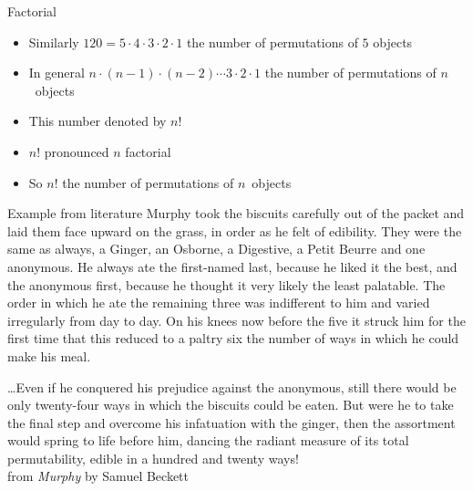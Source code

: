 \documentclass[handout]{beamer}
\theoremstyle{definition}
\begin{document}
\begin{frame}{Factorial}
\begin{itemize}
\item Similarly $120=5\cdot 4\cdot 3\cdot 2\cdot 1$
the number of permutations of $5$ objects
\item In general $n\cdot\left(n-1\right)\cdot\left(n-2\right)
\cdots 3\cdot 2\cdot 1$ the number of permutations of $n$~objects
\item This number denoted by $n!$
\item $n!$ pronounced \alert{$n$ factorial}
\item So $n!$ the number of permutations of $n$~objects
\end{itemize}
\end{frame}

\begin{frame}{Example from literature}
Murphy took the biscuits carefully out of the packet and laid them face
upward on the grass, in order as he felt of edibility. They were
the same as always, a Ginger, an Osborne, a Digestive, a Petit
Beurre and one anonymous. He always ate the first-named last, because
he liked it the best, and the anonymous first, because he thought
it very likely the least palatable. The order in which he ate the
remaining three was indifferent to him and varied irregularly from
day to day. On his knees now before the five it struck him for the
first time that this reduced to a paltry six the number of ways in
which he could make his meal.
\end{frame}
\begin{frame}
\dots Even if he conquered his
prejudice against the anonymous, still there would be only twenty-four
ways in which the biscuits could be eaten. But were he to take the
final step and overcome his infatuation with the ginger, then the
assortment would spring to life before him, dancing the radiant
measure of its total permutability, edible in a hundred and twenty
ways!\\
\hfill
from {\em Murphy} by Samuel Beckett
\end{frame}
\end{document}
